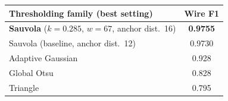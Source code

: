 {\small
\setlength{\tabcolsep}{8pt}
\begin{tabular}{p{6.0cm}c}
\toprule
Thresholding family (best setting) & Wire F1 \\
\midrule
\textbf{Sauvola} ($k=0.285$, $w=67$, anchor dist.\ 16) & \textbf{0.9755} \\
Sauvola (baseline, anchor dist.\ 12) & 0.9730 \\
Adaptive Gaussian & 0.928 \\
Global Otsu & 0.828 \\
Triangle & 0.795 \\
\bottomrule
\end{tabular}
}

